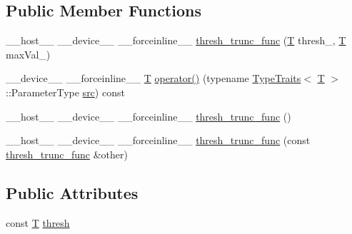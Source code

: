 \subsection*{Public Member Functions}
\begin{DoxyCompactItemize}
\item 
\-\_\-\-\_\-host\-\_\-\-\_\- \-\_\-\-\_\-device\-\_\-\-\_\- \-\_\-\-\_\-forceinline\-\_\-\-\_\- \hyperlink{structcv_1_1gpu_1_1device_1_1thresh__trunc__func_ab6ad7e54cc24a87a61d65be02e6f73c5}{thresh\-\_\-trunc\-\_\-func} (\hyperlink{calib3d_8hpp_a3efb9551a871ddd0463079a808916717}{T} thresh\-\_\-, \hyperlink{calib3d_8hpp_a3efb9551a871ddd0463079a808916717}{T} max\-Val\-\_)
\item 
\-\_\-\-\_\-device\-\_\-\-\_\- \-\_\-\-\_\-forceinline\-\_\-\-\_\- \hyperlink{calib3d_8hpp_a3efb9551a871ddd0463079a808916717}{T} \hyperlink{structcv_1_1gpu_1_1device_1_1thresh__trunc__func_af8e78f5df98bc34909cffb2f46e41400}{operator()} (typename \hyperlink{structcv_1_1gpu_1_1device_1_1TypeTraits}{Type\-Traits}$<$ \hyperlink{calib3d_8hpp_a3efb9551a871ddd0463079a808916717}{T} $>$\-::Parameter\-Type \hyperlink{legacy_8hpp_a371cd109b74033bc4366f584edd3dacc}{src}) const 
\item 
\-\_\-\-\_\-host\-\_\-\-\_\- \-\_\-\-\_\-device\-\_\-\-\_\- \-\_\-\-\_\-forceinline\-\_\-\-\_\- \hyperlink{structcv_1_1gpu_1_1device_1_1thresh__trunc__func_ada826bc6255f29242c8da790278a5dba}{thresh\-\_\-trunc\-\_\-func} ()
\item 
\-\_\-\-\_\-host\-\_\-\-\_\- \-\_\-\-\_\-device\-\_\-\-\_\- \-\_\-\-\_\-forceinline\-\_\-\-\_\- \hyperlink{structcv_1_1gpu_1_1device_1_1thresh__trunc__func_a7c03cf5b4de2e154cde2bde0abd15e8d}{thresh\-\_\-trunc\-\_\-func} (const \hyperlink{structcv_1_1gpu_1_1device_1_1thresh__trunc__func}{thresh\-\_\-trunc\-\_\-func} \&other)
\end{DoxyCompactItemize}
\subsection*{Public Attributes}
\begin{DoxyCompactItemize}
\item 
const \hyperlink{calib3d_8hpp_a3efb9551a871ddd0463079a808916717}{T} \hyperlink{structcv_1_1gpu_1_1device_1_1thresh__trunc__func_af1707bdc87c8fd6d63725cd8303a3df9}{thresh}
\end{DoxyCompactItemize}


